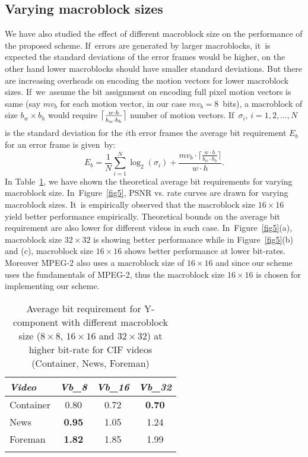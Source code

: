 \documentclass{doublecol-new}
\theoremstyle{TH}{
\newtheorem{lemma}{Lemma}[section]
\newtheorem{theorem}{Theorem}
\newtheorem{corrolary}{Corrolary}
\newtheorem{conjecture}[lemma]{Conjecture}
\newtheorem{proposition}[lemma]{Proposition}
\newtheorem{claim}[lemma]{Claim}
\newtheorem{stheorem}[lemma]{Wrong Theorem}
}
\theoremstyle{THrm}{
\newtheorem{definition}{Definition}[section]
\newtheorem{question}{Question}[section]
\newtheorem{remark}{Remark}[section]
\newtheorem{scheme}{Scheme}
}
\theoremstyle{THhit}{
\newtheorem{case}{Case}[section]
}
\begin{document}
\subsection{Varying macroblock sizes}

We have also studied the effect of different macroblock size on the performance
of the proposed scheme. If~errors are generated by larger macroblocks, it~is
expected the standard deviations of the error frames would be higher, on the
other hand lower macroblocks should have smaller standard deviations. But there
are increasing overheads on encoding the motion vectors for lower macroblock
sizes. If~we~assume the bit assignment on encoding full pixel motion vectors is
same (say $mv_b$ for each motion vector, in our case $mv_b = 8$~bits), a
macroblock of size $b_w \times b_h$ would require $\big\lceil \frac{w\cdot
h}{b_w\cdot b_h\vphantom{\sum_{1_1}}}\big\rceil$ number of motion vectors.
If~$\sigma_i$, $i=1,2,\dots,N$ is the standard deviation for the $i$th error
frames the average bit requirement $E_b$ for an error frame is given~by:
\begin{equation}
E_b= \frac{1}{N}\sum_{i=1}^{N}\log_2(\sigma_i)+\frac{mv_b\cdot\big\lceil
\frac{w\cdot h}{b_w\cdot b_h}\big\rceil}{w\cdot h}.
\end{equation}
In Table~\ref{Avgbit}, we have shown the theoretical average bit
requirements for varying macroblock size. In~Figure~\ref{fig5}, PSNR vs.
rate curves are drawn for varying macroblock sizes. It~is empirically
observed that the macroblock size $16 \times 16$ yield better performance
empirically. Theoretical bounds on the average bit requirement are also
lower for different videos in such case. In~Figure~\ref{fig5}(a),
macroblock size $32 \times 32$ is showing better performance while in
Figure~\ref{fig5}(b) and (c), macroblock size $16 \times 16$ shows better
performance at lower bit-rates. Moreover \h{MPEG-2} also uses a macroblock
size of $16 \times 16$ and since our scheme uses the fundamentals of
\h{MPEG-2}, thus the macroblock size $16 \times 16$ is chosen for
implementing our scheme.

\begin{table}%
\def\arraystretch{1.1}
\caption{Average bit requirement for Y-component with different macroblock
size ($8\times8$, $16\times16$ and $32\times32$) at higher bit-rate for
CIF videos (Container, News, Foreman)}\label{Avgbit}
{\NINE\begin{tabular*}{\columnwidth}{@{\extracolsep{\fill}}lccc@{}}
\toprule {\it Video} & {\it Vb\_8} & {\it Vb\_16} & {\it Vb\_32}\\
\midrule Container & 0.80 & 0.72 & {\bf 0.70}\\
 News & {\bf 0.95} & 1.05 & 1.24\\
 Foreman & {\bf 1.82} & 1.85 & 1.99\\
\botrule
\end{tabular*}}
{}
\end{table}
\end{document}
